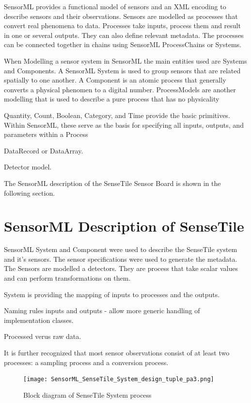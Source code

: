 \documentclass[]{final_report}
\begin{document}
SensorML provides a functional model of sensors and an XML encoding to describe sensors and their observations.
Sensors are modelled as processes that convert real phenomena to data. Processes take inputs, process them and result in one or several outputs. They can also define relevant metadata. The processes can be connected together in chains using SensorML ProcessChains or Systems. 

When Modelling a sensor system in SensorML the main entities used are Systems and Components. A SensorML System is used to group sensors that are related spatially to one another.  A Component is an atomic process that generally converts a physical phenomen to a digital number. ProcessModels are another modelling that is used to describe a pure process that has no physicality

Quantity, Count, Boolean, Category, and Time provide the basic primitives. Within SensorML, these serve as the basis for specifying all inputs, outputs, and parameters within a Process

DataRecord or DataArray.

Detector model.

The SensorML description of the SenseTile Sensor Board is shown in the following section.

\section{SensorML Description of SenseTile}

SensorML System and Component were used to describe the SenseTile system and it's sensors. The sensor specifications were used to generate the metadata.
The Sensors are modelled a detectors. They are process that take scalar values
and can perform transformations on them.

System is providing the mapping of inputs to processes and the outputs.

Naming rules inputs and outputs - allow more generic handling of implementation classes.

Processed verus raw data.

It is further recognized that most sensor observations consist of at least two processes: a sampling process and a conversion process.

 \begin{figure}
\texttt{[image: SensorML\_SenseTile\_System\_design\_tuple\_pa3.png]}
\caption{Block diagram of SenseTile System process}\label{fig:SensorML_SenseTile_design.png}
\end{figure}
\end{document}

